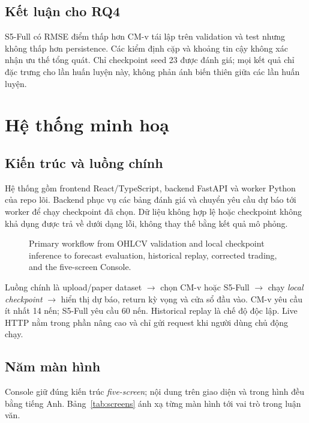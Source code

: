 \documentclass[13pt,a4paper,oneside]{report}
\begin{document}
\section{Kết luận cho RQ4}\label{sec:s5-conclusion}
S5-Full có RMSE điểm thấp hơn CM-v tái lập trên validation và test nhưng không thấp hơn persistence.
Các kiểm định cặp và khoảng tin cậy không xác nhận ưu thế tổng quát. Chỉ checkpoint seed 23 được đánh
giá; mọi kết quả chỉ đặc trưng cho lần huấn luyện này, không phản ánh biến thiên giữa các lần huấn
luyện.

\chapter{Hệ thống minh hoạ}\label{chap:system}

\section{Kiến trúc và luồng chính}\label{sec:system-flow}
Hệ thống gồm frontend React/TypeScript, backend FastAPI và worker Python của repo lõi. Backend phục vụ
các bảng đánh giá và chuyển yêu cầu dự báo tới worker để chạy checkpoint đã chọn. Dữ liệu không hợp
lệ hoặc checkpoint không khả dụng được trả về dưới dạng lỗi, không thay thế bằng kết quả mô phỏng.

\begin{figure}[htbp]
\centering
\resizebox{\linewidth}{!}{}
\caption[System workflow]{Primary workflow from OHLCV validation and local checkpoint inference to
forecast evaluation, historical replay, corrected trading, and the five-screen Console.}
\label{fig:system-flow}
\end{figure}

Luồng chính là upload/paper dataset $\to$ chọn CM-v hoặc S5-Full $\to$ chạy \emph{local checkpoint}
$\to$ hiển thị dự báo, return kỳ vọng và cửa sổ đầu vào. CM-v yêu cầu ít nhất 14 nến;
S5-Full yêu cầu 60 nến. Historical replay là chế độ độc lập. Live HTTP nằm trong phần nâng cao và
chỉ gửi request khi người dùng chủ động chạy.

\section{Năm màn hình}\label{sec:five-screens}
Console giữ đúng kiến trúc \emph{five-screen}; nội dung trên giao diện và trong hình đều bằng tiếng
Anh. Bảng~\ref{tab:screens} ánh xạ từng màn hình tới vai trò trong luận văn.
\end{document}
